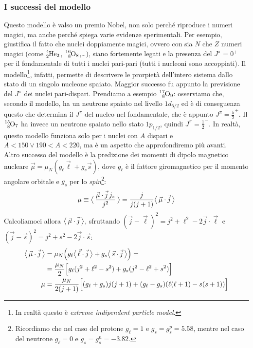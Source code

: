 \subsubsection{I successi del modello} 
Questo modello è valso un premio Nobel, non solo perché riproduce i numeri magici, ma anche perché spiega varie evidenze sperimentali. Per esempio, giustifica il fatto che nuclei doppiamente magici, ovvero con sia $N$ che $Z$ numeri magici (come $\ce{^4_2He_2}$, $\ce{^{16}_8O_8}$,\dots), siano fortemente legati e la presenza del $J^\pi = 0^+$ per il fondamentale di tutti i nuclei pari-pari (tutti i nucleoni sono accoppiati). Il modello\footnote{In realtà questo è \textit{extreme indipendent particle model}.}, infatti, permette di descrivere le prorpietà dell'intero sistema dallo stato di un singolo nucleone spaiato.
Maggior successo fu appunto la previsione del $J^\pi$ dei nuclei pari-dispari. Prendiamo a esempio $\ce{^{17}_8O_9}$: osserviamo che, secondo il modello, ha un neutrone spaiato nel livello $1d_{5/2}$ ed è di conseguenza questo che determina il $J^\pi$ del nucleo nel fondamentale, che è appunto $J^\pi=\frac{5}{2}^+$. Il $\ce{^15_8O_7}$ ha invece un neutrone spaiato nello stato $1p_{1/2}$, quindi $J^\pi = \frac{1}{2}^-$. In realtà, questo modello funziona solo per i nuclei con $A$ dispari e $A<150 \vee 190<A<220$, ma è un aspetto che approfondiremo più avanti.\\
Altro successo del modello è la predizione dei momenti di dipolo magnetico nucleare $\vec{\mu} = \mu_N (g_\ell \vec{\ell}+g_s \vec{s})$, dove $g_\ell$ è il fattore giromagnetico per il momento angolare orbitale e $g_s$ per lo \textit{spin}\footnote{Ricordiamo che nel caso del protone $g_\ell = 1$ e $g_s=g_s^p = 5.58$, mentre nel caso del neutrone $g_\ell = 0$ e $g_s=g_s^n = -3.82$.}:
$$\mu \equiv \bigl\langle\, \frac{\vec{\mu}\cdot\vec{j}\, j_z}{j^2}\, \bigr\rangle = \frac{j}{j(j+1)}\bigl\langle\, \vec{\mu}\cdot\vec{j}\, \bigr\rangle$$
Calcoliamoci allora $\bigl\langle\, \vec{\mu}\cdot\vec{j}\, \bigr\rangle$, sfruttando $(\vec{j}-\vec{\ell})^2 = j^2 + \ell^2 -2\vec{j}\cdot\vec{\ell}$ e $(\vec{j}-\vec{s})^2 = j^2 + s^2 - 2\vec{j}\cdot\vec{s}$:
\begin{displaymath}
\begin{aligned}
\bigl\langle\, \vec{\mu}\cdot\vec{j}\, \bigr\rangle &= \mu_N \Bigl (g_\ell \bigl\langle\, \vec{\ell}\cdot\vec{j}\, \bigr\rangle +g_s \bigl\langle\, \vec{s}\cdot\vec{j}\, \bigr\rangle \Bigr ) = \\
&= \frac{\mu_N}{2} \Bigl [g_\ell (j^2 + \ell^2 - s^2) + g_s (j^2-\ell^2+s^2) \Bigr ] \\
\mu &= \frac{\mu_N}{2(j+1)} \Bigl [(g_\ell+g_s) j(j+1) + (g_\ell-g_s) (\ell(\ell+1)-s(s+1)) \Bigr ]
\end{aligned}
\end{displaymath}
